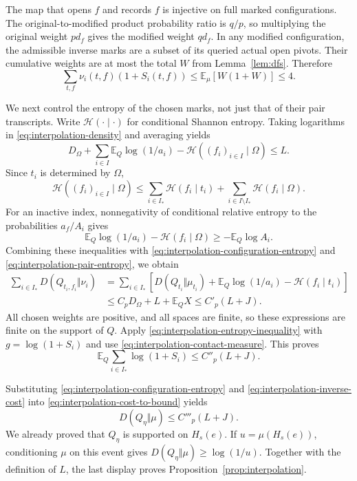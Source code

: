 \documentclass[11pt]{article}
\theoremstyle{definition}
\newcommand{\EE}{\mathbb E}
\begin{document}
The map that opens $f$ and records $f$ is injective on full marked
configurations. The original-to-modified product probability ratio is
$q/p$, so multiplying the original weight $pd_f$ gives the modified
weight $qd_f$. In any modified configuration, the admissible inverse
marks are a subset of its queried actual open pivots. Their cumulative
weights are at most the total $W$ from Lemma~\ref{lem:dfs}. Therefore
\begin{equation}\label{eq:interpolation-contact-measure}
 \sum_{t,f}\nu_i(t,f)(1+S_i(t,f))
 \le\EE_\mu[W(1+W)]\le4.
\end{equation}

We next control the entropy of the chosen marks, not just that of their
pair transcripts. Write $\mathcal H(\cdot\mid\cdot)$ for conditional
Shannon entropy. Taking logarithms in
\eqref{eq:interpolation-density} and averaging yields
\begin{equation}\label{eq:interpolation-joint-contact-cost}
 D_\Omega+\sum_{i\in I}\EE_Q\log(1/a_i)
       -\mathcal H((f_i)_{i\in I}\mid\Omega)\le L.
\end{equation}
Since $t_i$ is determined by $\Omega$,
\[
 \mathcal H((f_i)_{i\in I}\mid\Omega)
 \le\sum_{i\in I_*}\mathcal H(f_i\mid t_i)
    +\sum_{i\in I\setminus I_*}\mathcal H(f_i\mid\Omega).
\]
For an inactive index, nonnegativity of conditional relative entropy
to the probabilities $a_f/A_i$ gives
\[
 \EE_Q\log(1/a_i)-\mathcal H(f_i\mid\Omega)
 \ge-\EE_Q\log A_i.
\]
Combining these inequalities with
\eqref{eq:interpolation-configuration-entropy} and
\eqref{eq:interpolation-pair-entropy}, we obtain
\begin{align*}
 \sum_{i\in I_*}D(Q_{t_i,f_i}\Vert\nu_i)
 &=\sum_{i\in I_*}\left[
 D(Q_{t_i}\Vert\mu_{t_i})+
 \EE_Q\log(1/a_i)-\mathcal H(f_i\mid t_i)\right]\\
 &\le C_pD_\Omega+L+\EE_Q X
 \le C'_p(L+J).
\end{align*}
All chosen weights are positive, and all spaces are finite, so these
expressions are finite on the support of $Q$.
Apply \eqref{eq:interpolation-entropy-inequality} with
$g=\log(1+S_i)$ and use
\eqref{eq:interpolation-contact-measure}. This proves
\begin{equation}\label{eq:interpolation-inverse-cost}
 \EE_Q\sum_{i\in I_*}\log(1+S_i)\le C''_p(L+J).
\end{equation}

Substituting \eqref{eq:interpolation-configuration-entropy} and
\eqref{eq:interpolation-inverse-cost} into
\eqref{eq:interpolation-cost-to-bound} yields
\begin{equation}\label{eq:interpolation-output-entropy}
 D(Q_\eta\Vert\mu)\le C'''_p(L+J).
\end{equation}
We already proved that $Q_\eta$ is supported on $H_s(e)$. If
$u=\mu(H_s(e))$, conditioning $\mu$ on this event gives
$D(Q_\eta\Vert\mu)\ge\log(1/u)$.
Together with the definition of $L$, the last display proves
Proposition~\ref{prop:interpolation}.
\end{document}
